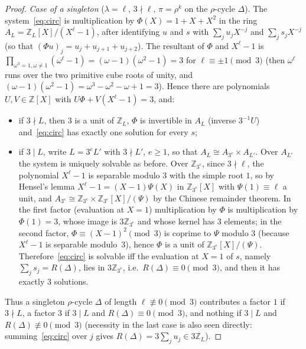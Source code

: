 \documentclass[preprint,12pt]{elsarticle}
\theoremstyle{definition}\newtheorem{defi}[thm]{Definition}\newtheorem{prob}[thm]{Problem}\newtheorem{obs}[thm]{Observation}
\theoremstyle{remark}\newtheorem{rem}[thm]{Remark}
\newcommand{\ZZ}{\mathbb Z}\newcommand{\Sym}{\operatorname{Sym}}\newcommand{\Alt}{\operatorname{Alt}}
\begin{document}
\begin{proof}
\emph{Case of a singleton} ($\lambda=\ell$, $3\nmid\ell$, $\pi=\rho^{k}$ on the $\rho$-cycle $\Delta$). The system~\eqref{eq:circ} is multiplication by $\Phi(X)=1+X+X^{2}$ in the ring $A_L=\ZZ_L[X]/(X^{\ell}-1)$, after identifying $u$ and $s$ with $\sum_j u_jX^{-j}$ and $\sum_j s_jX^{-j}$ (so that $(\Phi u)_j=u_j+u_{j+1}+u_{j+2}$). The resultant of $\Phi$ and $X^{\ell}-1$ is $\prod_{\omega^{3}=1,\omega\ne1}(\omega^{\ell}-1)=(\omega-1)(\omega^{2}-1)=3$ for $\ell\equiv\pm1\pmod3$ (then $\omega^{\ell}$ runs over the two primitive cube roots of unity, and $(\omega-1)(\omega^{2}-1)=\omega^{3}-\omega^{2}-\omega+1=3$). Hence there are polynomials $U,V\in\ZZ[X]$ with $U\Phi+V(X^{\ell}-1)=3$, and:
\begin{itemize}
\item if $3\nmid L$, then $3$ is a unit of $\ZZ_L$, $\Phi$ is invertible in $A_L$ (inverse $3^{-1}U$) and~\eqref{eq:circ} has exactly one solution for every $s$;
\item if $3\mid L$, write $L=3^{e}L'$ with $3\nmid L'$, $e\ge1$, so that $A_L\cong A_{3^{e}}\times A_{L'}$. Over $A_{L'}$ the system is uniquely solvable as before. Over $\ZZ_{3^{e}}$, since $3\nmid\ell$, the polynomial $X^{\ell}-1$ is separable modulo $3$ with the simple root $1$, so by Hensel's lemma $X^{\ell}-1=(X-1)\Psi(X)$ in $\ZZ_{3^{e}}[X]$ with $\Psi(1)\equiv\ell$ a unit, and $A_{3^{e}}\cong\ZZ_{3^{e}}\times\ZZ_{3^{e}}[X]/(\Psi)$ by the Chinese remainder theorem. In the first factor (evaluation at $X=1$) multiplication by $\Phi$ is multiplication by $\Phi(1)=3$, whose image is $3\ZZ_{3^{e}}$ and whose kernel has $3$ elements; in the second factor, $\Phi\equiv(X-1)^{2}\pmod 3$ is coprime to $\Psi$ modulo $3$ (because $X^{\ell}-1$ is separable modulo~$3$), hence $\Phi$ is a unit of $\ZZ_{3^{e}}[X]/(\Psi)$. Therefore~\eqref{eq:circ} is solvable iff the evaluation at $X=1$ of $s$, namely $\sum_j s_j=R(\Delta)$, lies in $3\ZZ_{3^{e}}$, i.e.\ $R(\Delta)\equiv0\pmod 3$, and then it has exactly $3$ solutions.
\end{itemize}
Thus a singleton $\rho$-cycle $\Delta$ of length $\ell\not\equiv0\pmod 3$ contributes a factor $1$ if $3\nmid L$, a factor $3$ if $3\mid L$ and $R(\Delta)\equiv0\pmod3$, and nothing if $3\mid L$ and $R(\Delta)\not\equiv0\pmod 3$ (necessity in the last case is also seen directly: summing~\eqref{eq:circ} over $j$ gives $R(\Delta)=3\sum_j u_j\in3\ZZ_L$).


\end{proof}
\end{document}
